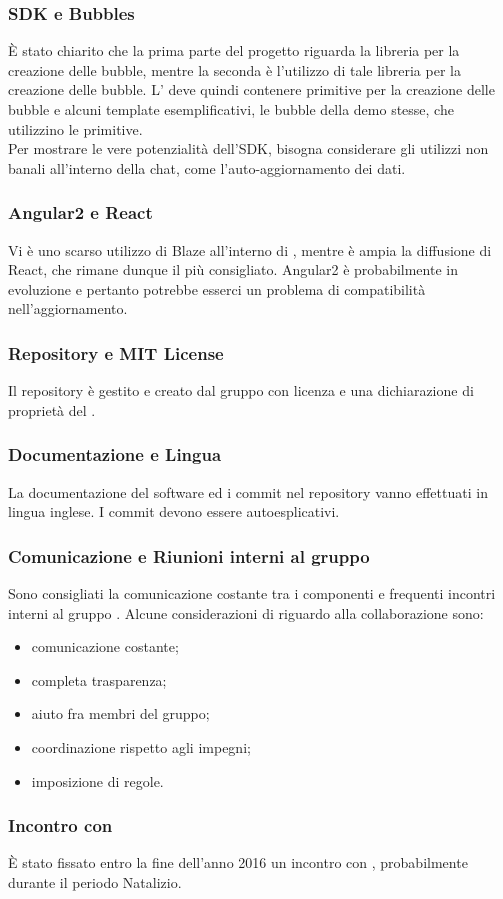 \subsubsection{SDK e Bubbles}
È stato chiarito che la prima parte del progetto riguarda la libreria per la creazione delle bubble, mentre la seconda è l'utilizzo di tale libreria per la creazione delle bubble. L' deve quindi contenere primitive per la creazione delle bubble e alcuni template esemplificativi, le bubble della demo stesse, che utilizzino le primitive.\\
Per mostrare le vere potenzialità dell'SDK, bisogna considerare gli utilizzi non banali all'interno della chat, come l'auto-aggiornamento dei dati.

\subsubsection{Angular2 e React}
Vi è uno scarso utilizzo di Blaze all'interno di , mentre è ampia la diffusione di React, che rimane dunque il più consigliato. Angular2 è probabilmente in evoluzione e pertanto potrebbe esserci un problema di compatibilità nell'aggiornamento.

\subsubsection{Repository e MIT License}
Il repository è gestito e creato dal gruppo \GroupName{} con licenza  e una dichiarazione di proprietà del \Proponente{}.

\subsubsection{Documentazione e Lingua}
La documentazione del software ed i commit nel repository vanno effettuati in lingua inglese. I commit devono essere autoesplicativi.

\subsubsection{Comunicazione e Riunioni interni al gruppo \GroupName{}}
Sono consigliati la comunicazione costante tra i componenti e frequenti incontri interni al gruppo \GroupName{}. Alcune considerazioni di \Proponente{} riguardo alla collaborazione sono: 
\begin{itemize}
	\item comunicazione costante;
	\item completa trasparenza;
	\item aiuto fra membri del gruppo;
	\item coordinazione rispetto agli impegni;
	\item imposizione di regole.
\end{itemize}

\subsubsection{Incontro con \Proponente}
È stato fissato entro la fine dell'anno 2016 un incontro con \Proponente{}, probabilmente durante il periodo Natalizio.

\clearpage
